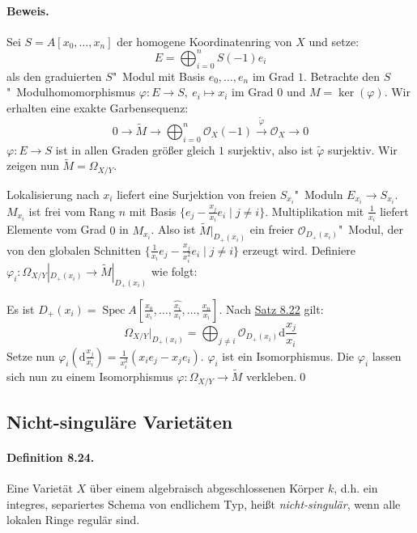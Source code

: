 \paragraph{Beweis.} Sei $S=A[x_0,\ldots,x_n]$ der homogene Koordinatenring von $X$ und setze:
\[E=\bigoplus_{i=0}^n S(-1)e_i\]
als den graduierten $S$"~Modul mit Basis $e_0,\ldots,e_n$ im Grad $1$. Betrachte den $S$"~Mo\-dul\-ho\-mo\-mor\-phis\-mus $\varphi:E\to S,\ e_i\mapsto x_i$ im Grad $0$ und $M=\ker(\varphi)$. Wir erhalten eine exakte Garbensequenz:
\[0\longrightarrow\widetilde{M}\longrightarrow\bigoplus_{i=0}^n\mathcal{O}_X(-1)\stackrel{\tilde{\varphi}}{\longrightarrow}\mathcal{O}_X\longrightarrow 0 \]
$\varphi:E\to S$ ist in allen Graden größer gleich $1$ surjektiv, also ist $\tilde{\varphi}$ surjektiv. Wir zeigen nun $\widetilde{M}=\Omega_{X/Y}$.

Lokalisierung nach $x_i$ liefert eine Surjektion von freien $S_{x_i}$"~Moduln $E_{x_i}\to S_{x_i}$. $M_{x_i}$ ist frei vom Rang $n$ mit Basis $\{e_j-\frac{x_j}{x_i}e_i\mid j\neq i\}$. Multiplikation mit $\frac{1}{x_i}$ liefert Elemente vom Grad $0$ in $M_{x_i}$. Also ist $\widetilde{M}|_{D_+(x_i)}$ ein freier $\mathcal{O}_{D_+(x_i)}$"~Modul, der von den globalen Schnitten $\{\frac{1}{x_i}e_j-\frac{x_j}{x_i^2}e_i\mid j\neq i \}$ erzeugt wird. Definiere $\varphi_i:\Omega_{X/Y}|_{D_+(x_i)}\to\widetilde{M}|_{D_+(x_i)}$ wie folgt:

Es ist $D_+(x_i)=\operatorname{Spec}A[\frac{x_0}{x_i},\ldots,\widehat{\frac{x_i}{x_i}},\ldots,\frac{x_n}{x_i}]$. Nach \hyperref[8.22]{Satz 8.22} gilt:
\[\Omega_{X/Y}|_{D_+(x_i)}=\bigoplus_{j\neq i}\mathcal{O}_{D_+(x_i)}\mathrm{d}\frac{x_j}{x_i} \]
Setze nun $\varphi_i(\mathrm{d}\frac{x_j}{x_i})=\frac{1}{x_i^2}(x_ie_j-x_je_i)$. $\varphi_i$ ist ein Isomorphismus. Die $\varphi_i$ lassen sich nun zu einem Isomorphismus $\varphi:\Omega_{X/Y}\to\widetilde{M}$ verkleben.\qed

\subsection{Nicht-singuläre Varietäten}

\paragraph{Definition 8.24.}\label{8.24} Eine Varietät $X$ über einem algebraisch abgeschlossenen Körper $k$, d.h. ein integres, separiertes Schema von endlichem Typ, heißt \textit{nicht-singulär}, wenn alle lokalen Ringe regulär sind.

